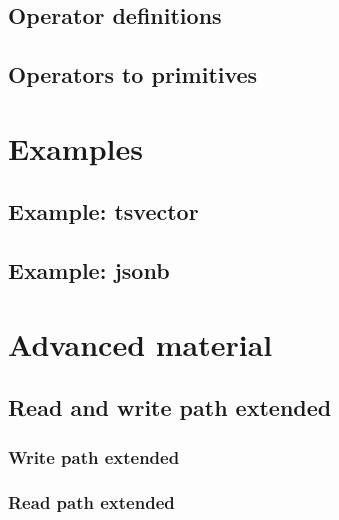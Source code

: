 \documentclass[11pt]{article}
\begin{document}
\hypertarget{operator-definitions}{%
\subsection{Operator definitions}\label{operator-definitions}}


\hypertarget{operators-to-primitives}{%
\subsection{Operators to primitives}\label{operators-to-primitives}}


\newpage
\hypertarget{examples}{%
\section{Examples}\label{examples}}

\hypertarget{example-tsvector}{%
\subsection{Example: tsvector}\label{example-tsvector}}


\hypertarget{example-jsonb}{%
\subsection{Example: jsonb}\label{example-jsonb}}


\newpage
\hypertarget{advanced-material}{%
\section{Advanced material}\label{advanced-material}}


\hypertarget{read-and-write-path-extended}{%
\subsection{Read and write path extended}\label{read-and-write-path-extended}}

\hypertarget{write-path-extended}{%
\subsubsection{Write path extended}\label{write-path-extended}}


\hypertarget{read-path-extended}{%
\subsubsection{Read path extended}\label{read-path-extended}}

\end{document}
